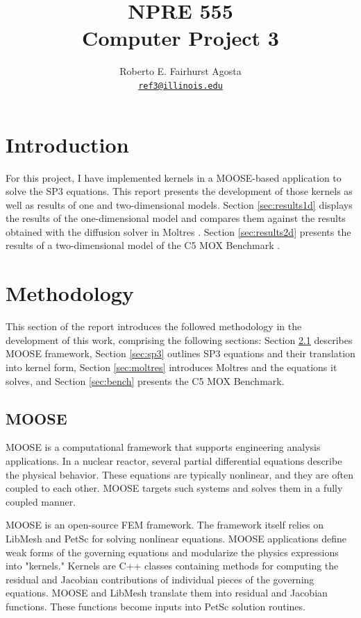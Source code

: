 \documentclass[letterpaper]{article}
\author{Roberto E. Fairhurst Agosta
        \\ \href{mailto:ref3@illinois.edu}{\texttt{ref3@illinois.edu}}
}
\title{NPRE 555\\ Computer Project 3}
\begin{document}
\begin{titlepage}
\maketitle
\thispagestyle{empty}
\end{titlepage}

\section{Introduction}

For this project, I have implemented kernels in a \gls{MOOSE}-based application \cite{gaston_moose_2009} to solve the \gls{SP3} equations.
This report presents the development of those kernels as well as results of one and two-dimensional models.
Section \ref{sec:results1d} displays the results of the one-dimensional model and compares them against the results obtained with the diffusion solver in Moltres \cite{lindsay_introduction_2018}.
Section \ref{sec:results2d} presents the results of a two-dimensional model of the C5 MOX Benchmark \cite{capilla_applications_2009}.

\section{Methodology}

This section of the report introduces the followed methodology in the development of this work, comprising the following sections:
Section \ref{sec:moose} describes MOOSE framework, 
Section \ref{sec:sp3} outlines \gls{SP3} equations and their translation into kernel form,
Section \ref{sec:moltres} introduces Moltres and the equations it solves, 
and Section \ref{sec:bench} presents the C5 MOX Benchmark.

\subsection{MOOSE}
\label{sec:moose}

MOOSE is a computational framework that supports engineering analysis applications.
In a nuclear reactor, several partial differential equations describe the physical behavior.
These equations are typically nonlinear, and they are often coupled to each other.
MOOSE targets such systems and solves them in a fully coupled manner.

MOOSE is an open-source \gls{FEM} framework.
The framework itself relies on LibMesh \cite{kirk_libmesh_2006} and PetSc \cite{balay_petsc_2016} for solving nonlinear equations.
MOOSE applications define weak forms of the governing equations and modularize the physics expressions into "kernels."
Kernels are C++ classes containing methods for computing the residual and Jacobian contributions of individual pieces of the governing equations.
MOOSE and LibMesh translate them into residual and Jacobian functions.
These functions become inputs into PetSc solution routines.
\end{document}
